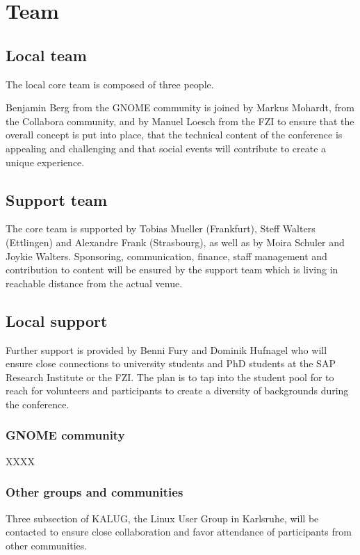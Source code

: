 
\section{Team}

\subsection{Local team}
The local core team is composed of three people.

Benjamin Berg from the GNOME community is joined by Markus Mohardt, from the Collabora community, and by Manuel Loesch from the FZI to ensure that the overall concept is put into place, that the technical content of the conference is appealing and challenging and that social events will contribute to create a unique experience.

\subsection{Support team}

The core team is supported by Tobias Mueller (Frankfurt), Steff Walters (Ettlingen) and Alexandre Frank (Strasbourg), as well as by Moira Schuler and Joykie Walters. Sponsoring, communication, finance, staff management and contribution to content will be ensured by the support team which is living in reachable distance from the actual venue. 

\subsection{Local support}

Further support is provided by Benni Fury and Dominik Hufnagel who will ensure close connections to university students and PhD students at the SAP Research Institute or the FZI. The plan is to tap into the student pool for to reach for volunteers and participants to create a diversity of backgrounds during the conference. 

\subsubsection{GNOME community}

XXXX


\subsubsection{Other groups and communities}

Three subsection of KALUG, the Linux User Group in Karlsruhe, will be contacted to ensure close collaboration and favor attendance of participants from other communities. 

